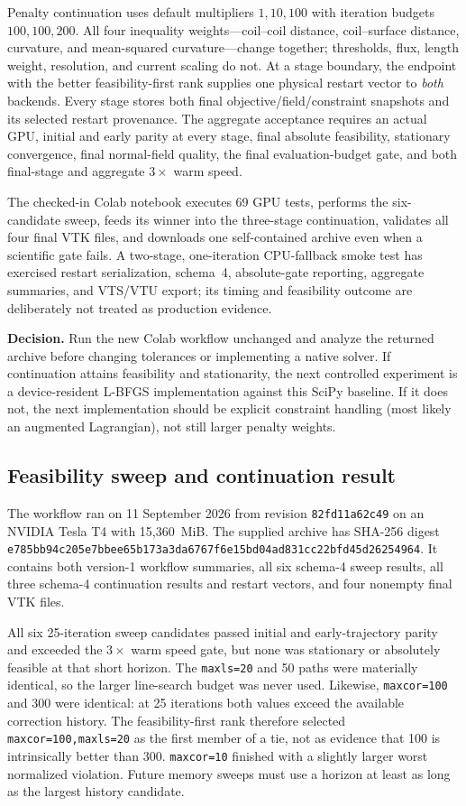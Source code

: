 \documentclass[11pt,a4paper]{article}
\newcommand{\code}[1]{\texttt{#1}}
\begin{document}
Penalty continuation uses default multipliers $1,10,100$ with iteration budgets
$100,100,200$.  All four inequality weights---coil--coil distance,
coil--surface distance, curvature, and mean-squared curvature---change together;
thresholds, flux, length weight, resolution, and current scaling do not.  At a
stage boundary, the endpoint with the better feasibility-first rank supplies
one physical restart vector to \emph{both} backends.  Every stage stores both
final objective/field/constraint snapshots and its selected restart provenance.
The aggregate acceptance requires an actual GPU, initial and early parity at
every stage, final absolute feasibility, stationary convergence, final
normal-field quality, the final evaluation-budget gate, and both final-stage
and aggregate $3\times$ warm speed.

The checked-in Colab notebook executes 69 GPU tests, performs the six-candidate
sweep, feeds its winner into the three-stage continuation, validates all four
final VTK files, and downloads one self-contained archive even when a scientific
gate fails.  A two-stage, one-iteration CPU-fallback smoke test has exercised
restart serialization, schema~4, absolute-gate reporting, aggregate summaries,
and VTS/VTU export; its timing and feasibility outcome are deliberately not
treated as production evidence.

\textbf{Decision.}  Run the new Colab workflow unchanged and analyze the
returned archive before changing tolerances or implementing a native solver.
If continuation attains feasibility and stationarity, the next controlled
experiment is a device-resident L-BFGS implementation against this SciPy
baseline.  If it does not, the next implementation should be explicit
constraint handling (most likely an augmented Lagrangian), not still larger
penalty weights.

\subsection{Feasibility sweep and continuation result}

The workflow ran on 11 September 2026 from revision \code{82fd11a62c49} on an
NVIDIA Tesla T4 with 15,360~MiB.  The supplied archive has SHA-256 digest
\nolinkurl{e785bb94c205e7bbee65b173a3da6767f6e15bd04ad831cc22bfd45d26254964}.
It contains both version-1 workflow summaries, all six schema-4 sweep results,
all three schema-4 continuation results and restart vectors, and four nonempty
final VTK files.

All six 25-iteration sweep candidates passed initial and early-trajectory
parity and exceeded the $3\times$ warm speed gate, but none was stationary or
absolutely feasible at that short horizon.  The \code{maxls=20} and 50 paths
were materially identical, so the larger line-search budget was never used.
Likewise, \code{maxcor=100} and 300 were identical: at 25 iterations both
values exceed the available correction history.  The feasibility-first rank
therefore selected \code{maxcor=100,maxls=20} as the first member of a tie, not
as evidence that 100 is intrinsically better than 300.  \code{maxcor=10}
finished with a slightly larger worst normalized violation.  Future memory
sweeps must use a horizon at least as long as the largest history candidate.
\end{document}
